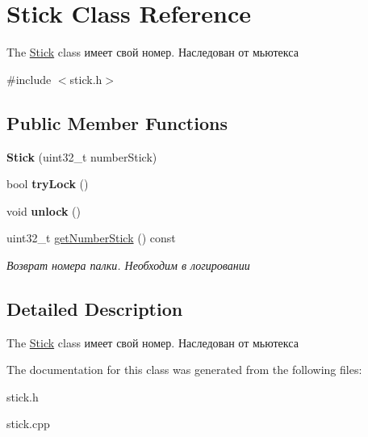 \hypertarget{classStick}{}\section{Stick Class Reference}
\label{classStick}


The \hyperlink{classStick}{Stick} class имеет свой номер. Наследован от мьютекса  




{\ttfamily \#include $<$stick.\+h$>$}

\subsection*{Public Member Functions}
\begin{DoxyCompactItemize}
\item 
\mbox{\label{classStick_ad4b3f831a2f5662d6895071ff2eed1f2}} 
{\bfseries Stick} (uint32\+\_\+t number\+Stick)
\item 
\mbox{\label{classStick_aaf7c3fddf3b7bf0b29106c03b3946908}} 
bool {\bfseries try\+Lock} ()
\item 
\mbox{\label{classStick_ad9436183637532a8b859bd29882f4b52}} 
void {\bfseries unlock} ()
\item 
\mbox{\label{classStick_a8bae354471ba99d8a034c4943f8919a0}} 
uint32\+\_\+t \hyperlink{classStick_a8bae354471ba99d8a034c4943f8919a0}{get\+Number\+Stick} () const
\begin{DoxyCompactList}\small\item\em Возврат номера палки. Необходим в логировании \end{DoxyCompactList}\end{DoxyCompactItemize}


\subsection{Detailed Description}
The \hyperlink{classStick}{Stick} class имеет свой номер. Наследован от мьютекса 

The documentation for this class was generated from the following files\+:\begin{DoxyCompactItemize}
\item 
stick.\+h\item 
stick.\+cpp\end{DoxyCompactItemize}
